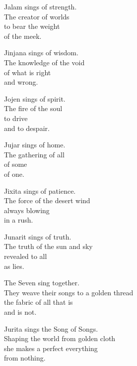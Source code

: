 \begin{singlespace}
\noindent Jalam sings of strength. \\
The creator of worlds \\
to bear the weight \\
of the meek.
\end{singlespace}
\vspace{1.0em}

\begin{singlespace}
\noindent Jinjana sings of wisdom. \\
The knowledge of the void \\
of what is right \\
and wrong.
\end{singlespace}
\vspace{1.0em}

\begin{singlespace}
\noindent Jojen sings of spirit. \\
The fire of the soul \\
to drive \\
and to despair.
\end{singlespace}
\vspace{1.0em}

\begin{singlespace}
\noindent Jujar sings of home. \\
The gathering of all \\
of some \\
of one.
\end{singlespace}
\vspace{1.0em}

\begin{singlespace}
\noindent Jixita sings of patience. \\
The force of the desert wind \\
always blowing \\
in a rush.
\end{singlespace}
\vspace{1.0em}

\begin{singlespace}
\noindent Junarit sings of truth. \\
The truth of the sun and sky \\
revealed to all \\
as lies.
\end{singlespace}
\vspace{1.0em}

\begin{singlespace}
\noindent The Seven sing together. \\
They weave their songs to a golden thread \\
the fabric of all that is \\
and is not.
\end{singlespace}
\vspace{1.0em}

\begin{singlespace}
\noindent Jurita sings the Song of Songs. \\
Shaping the world from golden cloth \\
she makes a perfect everything \\
from nothing.
\end{singlespace}
